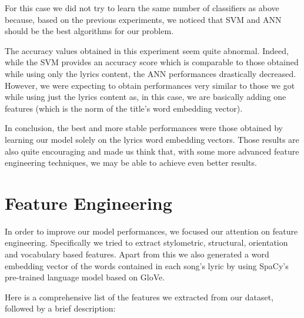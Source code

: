 For this case we did not try to learn the same number of classifiers as above because, based on the previous experiments, we noticed
that SVM and ANN should be the best algorithms for our problem. 

The accuracy values obtained in this experiment seem quite abnormal. Indeed,
while the SVM provides an accuracy score which is comparable to those obtained while using only the lyrics content, the ANN performances 
drastically decreased. However, we were expecting to obtain performances very similar to those we got while using just the lyrics content as, 
in  this case, we are basically adding one features (which is the norm of the title's word embedding vector).

In conclusion, the best and more stable performances were those obtained by learning our model solely on the lyrics word embedding vectors.
Those results are also quite encouraging and made us think that, with some more advanced feature engineering techniques,
we may be able to achieve even better results.

\section{Feature Engineering}
In order to improve our model performances, we focused our attention on feature engineering. Specifically we tried to extract stylometric, structural, orientation and vocabulary based features\cite{features}. Apart from this we also generated a word embedding vector of the words contained in each song's lyric by using SpaCy's\cite{spacy} pre-trained language model based on GloVe\cite{glove}.\par

Here is a comprehensive list of the features we extracted from our dataset, followed by a brief description:


